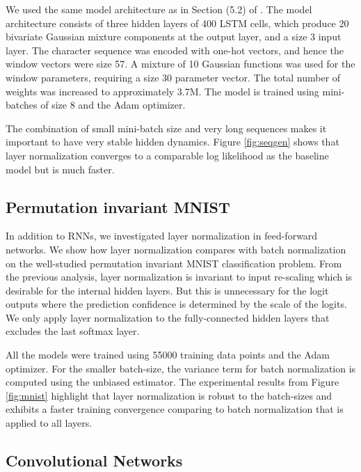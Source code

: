 We used the same model architecture as in Section (5.2) of \citet{graves2013generating}. The model architecture consists of three hidden layers of 400 LSTM cells, which produce 20 bivariate Gaussian mixture components at the output layer, and a size 3 input layer. The character sequence was encoded with one-hot vectors, and hence the window vectors were size 57. A mixture of 10 Gaussian functions was used for the window parameters, requiring a size 30 parameter vector. The total number of weights was increased to approximately 3.7M. The model is trained using mini-batches of size 8 and the Adam \citep{adam} optimizer.

The combination of small mini-batch size and very long sequences makes it important to have very stable hidden dynamics. Figure \ref{fig:seqgen} shows that layer normalization converges to a comparable log likelihood as the baseline model but is much faster.

\subsection{Permutation invariant MNIST}

In addition to RNNs, we investigated layer normalization in feed-forward networks. We show how layer normalization compares with batch normalization on the well-studied permutation invariant MNIST classification problem. From the previous analysis, layer normalization is invariant to input re-scaling which is desirable for the internal hidden layers. But this is unnecessary for the logit outputs where the prediction confidence is determined by the scale of the logits. We only apply layer normalization to the fully-connected hidden layers that excludes the last softmax layer.  

All the models were trained using 55000 training data points and the Adam \citep{adam} optimizer. For the smaller batch-size, the variance term for batch normalization is computed using the unbiased estimator. The experimental results from Figure \ref{fig:mnist} highlight that layer normalization is robust to the batch-sizes and exhibits a faster training convergence comparing to batch normalization that is applied to all layers.

\subsection{Convolutional Networks}
\label{sec:convnets}

